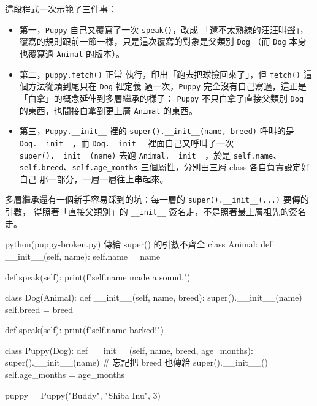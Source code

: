 
這段程式一次示範了三件事：

\begin{itemize}
\item 第一，\texttt{Puppy} 自己又覆寫了一次 \texttt{speak()}，改成
「還不太熟練的汪汪叫聲」，覆寫的規則跟前一節一樣，只是這次覆寫的對象是父類別 \texttt{Dog}
（而 \texttt{Dog} 本身也覆寫過 \texttt{Animal} 的版本）。
\item 第二，\texttt{puppy.fetch()} 正常
執行，印出「跑去把球撿回來了」，但 \texttt{fetch()} 這個方法從頭到尾只在 \texttt{Dog} 裡定義
過一次，\texttt{Puppy} 完全沒有自己寫過，這正是「白拿」的概念延伸到多層繼承的樣子：
\texttt{Puppy} 不只白拿了直接父類別 \texttt{Dog} 的東西，也間接白拿到更上層 \texttt{Animal}
的東西。
\item 第三，\texttt{Puppy.\_\_init\_\_} 裡的 \texttt{super().\_\_init\_\_(name, breed)}
呼叫的是 \texttt{Dog.\_\_init\_\_}，而 \texttt{Dog.\_\_init\_\_} 裡面自己又呼叫了一次
\texttt{super().\_\_init\_\_(name)} 去跑 \texttt{Animal.\_\_init\_\_}，於是 \texttt{self.name}、
\texttt{self.breed}、\texttt{self.age\_months} 三個屬性，分別由三層 class 各自負責設定好自己
那一部分，一層一層往上串起來。
\end{itemize}


多層繼承還有一個新手容易踩到的坑：每一層的 \texttt{super().\_\_init\_\_(...)} 要傳的引數，
得照著「直接父類別」的 \texttt{\_\_init\_\_} 簽名走，不是照著最上層祖先的簽名走。

\begin{example}{python}{(puppy-broken.py) 傳給 super() 的引數不齊全}
class Animal:
    def __init__(self, name):
        self.name = name

    def speak(self):
        print(f"{self.name} made a sound.")


class Dog(Animal):
    def __init__(self, name, breed):
        super().__init__(name)
        self.breed = breed

    def speak(self):
        print(f"{self.name} barked!")


class Puppy(Dog):
    def __init__(self, name, breed, age_months):
        super().__init__(name)  # 忘記把 breed 也傳給 super().__init__()
        self.age_months = age_months


puppy = Puppy("Buddy", "Shiba Inu", 3)
\end{example}


